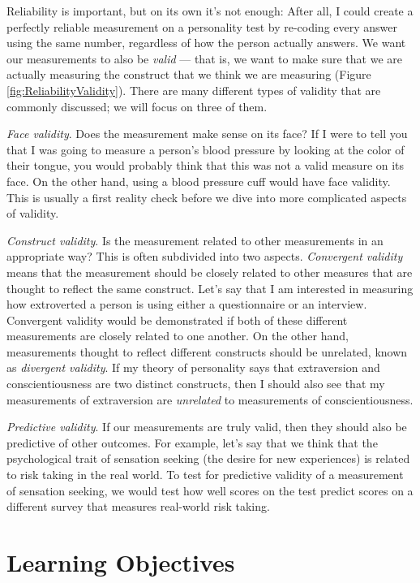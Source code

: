 \documentclass[12pt,]{book}
\theoremstyle{definition}
\theoremstyle{definition}
\theoremstyle{definition}
\theoremstyle{remark}
\begin{document}
Reliability is important, but on its own it's not enough: After all, I could create a perfectly reliable measurement on a personality test by re-coding every answer using the same number, regardless of how the person actually answers. We want our measurements to also be \emph{valid} --- that is, we want to make sure that we are actually measuring the construct that we think we are measuring (Figure \ref{fig:ReliabilityValidity}). There are many different types of validity that are commonly discussed; we will focus on three of them.

\emph{Face validity}. Does the measurement make sense on its face? If I were to tell you that I was going to measure a person's blood pressure by looking at the color of their tongue, you would probably think that this was not a valid measure on its face. On the other hand, using a blood pressure cuff would have face validity. This is usually a first reality check before we dive into more complicated aspects of validity.

\emph{Construct validity}. Is the measurement related to other measurements in an appropriate way? This is often subdivided into two aspects. \emph{Convergent validity} means that the measurement should be closely related to other measures that are thought to reflect the same construct. Let's say that I am interested in measuring how extroverted a person is using either a questionnaire or an interview. Convergent validity would be demonstrated if both of these different measurements are closely related to one another. On the other hand, measurements thought to reflect different constructs should be unrelated, known as \emph{divergent validity}. If my theory of personality says that extraversion and conscientiousness are two distinct constructs, then I should also see that my measurements of extraversion are \emph{unrelated} to measurements of conscientiousness.

\emph{Predictive validity}. If our measurements are truly valid, then they should also be predictive of other outcomes. For example, let's say that we think that the psychological trait of sensation seeking (the desire for new experiences) is related to risk taking in the real world. To test for predictive validity of a measurement of sensation seeking, we would test how well scores on the test predict scores on a different survey that measures real-world risk taking.

\hypertarget{learning-objectives-1}{%
\section{Learning Objectives}\label{learning-objectives-1}}
\end{document}
